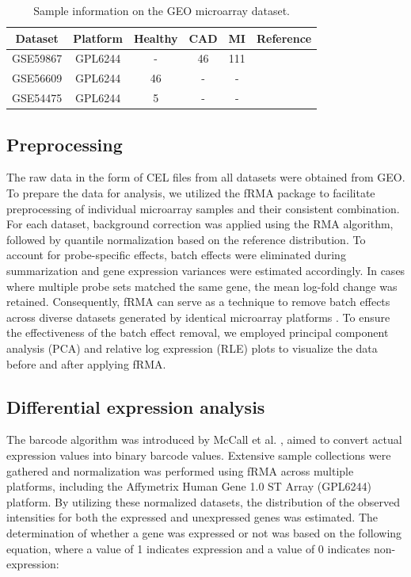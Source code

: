 \documentclass[sn-mathphys,Numbered]{sn-jnl}%
\theoremstyle{thmstyleone}%
\theoremstyle{thmstyletwo}%
\theoremstyle{thmstylethree}%
\begin{document}
\begin{table}[h]
\centering
\caption{Sample information on the GEO microarray dataset.}
\label{tab:datasets}
\begin{tabular}{cccccc}
\toprule
Dataset & Platform & Healthy & CAD & MI & Reference \\
\midrule
GSE59867 & GPL6244 & - & 46 & 111 & \cite{67} \\
GSE56609 & GPL6244 & 46 & - & - & \cite{09} \\
GSE54475 & GPL6244 & 5 & - & - & \cite{75} \\
\bottomrule
\end{tabular}
\end{table}


\subsection{Preprocessing}\label{preprocessing}

The raw data in the form of CEL files from all datasets were obtained
from GEO. To prepare the data for analysis, we utilized the fRMA package
\cite{fRMA} to facilitate preprocessing
of individual microarray samples and their consistent combination. For
each dataset, background correction was applied using the RMA algorithm,
followed by quantile normalization based on the reference distribution.
To account for probe-specific effects, batch effects were eliminated
during summarization and gene expression variances were estimated
accordingly. In cases where multiple probe sets matched the same gene,
the mean log-fold change was retained. Consequently, fRMA can serve as a
technique to remove batch effects across diverse datasets generated by
identical microarray platforms \cite{BER}. To ensure the
effectiveness of the batch effect removal, we employed principal
component analysis (PCA) and relative log expression (RLE) plots to
visualize the data before and after applying fRMA.

\subsection{Differential expression
analysis}\label{differential-expression-analysis}

The barcode algorithm was introduced by McCall et al. \cite{Barcode}, aimed to convert actual expression values into binary
barcode values. Extensive sample collections were gathered and
normalization was performed using fRMA across multiple platforms,
including the Affymetrix Human Gene 1.0 ST Array (GPL6244) platform. By
utilizing these normalized datasets, the distribution of the observed
intensities for both the expressed and unexpressed genes was estimated.
The determination of whether a gene was expressed or not was based on
the following equation, where a value of 1 indicates expression and a
value of 0 indicates non-expression:
\end{document}
